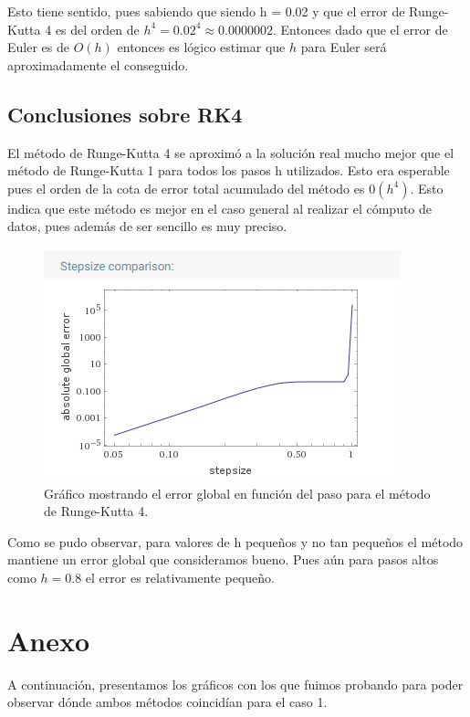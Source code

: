 \documentclass[titlepage,a4paper]{article}
\begin{document}
    Esto tiene sentido, pues sabiendo que siendo h = 0.02 y que el error de Runge-Kutta 4 es del orden de $h^{4} = 0.02^{4} \approx 0.0000002$. Entonces dado que el error de Euler es de $O(h)$ entonces es lógico estimar que $h$ para Euler será aproximadamente el conseguido.


\newpage

\subsection{Conclusiones sobre RK4}\label{sec:RK4}
    El método de Runge-Kutta 4 se aproximó a la solución real mucho mejor que el método de Runge-Kutta 1 para todos los pasos h utilizados. Esto era esperable pues el orden de la cota de error total acumulado del método es $0(h^4)$. Esto indica que este método es mejor en el caso general al realizar el cómputo de datos, pues además de ser sencillo es muy preciso.
    
    \begin{figure}[!htb]
        \centering
        \includegraphics[scale = 0.7]{ComparacionErrorConPaso/errorRK.png}
        \caption{Gráfico mostrando el error global en función del paso para el método de Runge-Kutta 4.}
        \label{fig:errorRK4}
    \end{figure}
    
    Como se pudo observar, para valores de h pequeños y no tan pequeños el método mantiene un error global que consideramos bueno. Pues aún para pasos altos como $h=0.8$ el error es relativamente pequeño.
    
\newpage

\section{Anexo}\label{sec:anexo}
    A continuación, presentamos los gráficos con los que fuimos probando para poder observar dónde ambos métodos coincidían para el caso 1.
    
\end{document}
